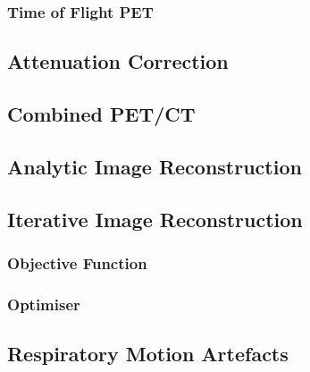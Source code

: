             \subsubsection{Time of Flight PET} \label{tof_pet}
                \blindtext
            
        \subsection{Attenuation Correction} \label{attenuation_correction}
            \blindtext
            
            \subsection{Combined PET/CT} \label{attenuation_correction}
                \blindtext
    
        \blindtext
        
        \subsection{Analytic Image Reconstruction} \label{analytic_image_reconstruction}
            \blindtext
        
        \subsection{Iterative Image Reconstruction} \label{iterative_image_reconstruction}
            \blindtext
            
            \subsubsection{Objective Function} \label{iterative_image_reconstruction_objective_function}
                \blindtext
                
            \subsubsection{Optimiser} \label{iterative_image_reconstruction_optimiser}
                \blindtext
    
        \blindtext
        
        \subsection{Respiratory Motion Artefacts} \label{respiratory_motion_artefacts}
            \blindtext
            
